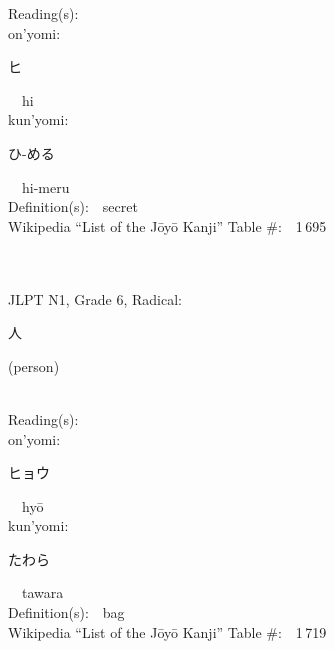\begin{multicols}{2}
Reading(s):\ \ \\
{\hspace*{1em}}on'yomi:\ \ \\
{\hspace*{2em}}{\begin{CJK}{UTF8}{min} ヒ \end{CJK}}\ \ hi\ \ \\
{\hspace*{1em}}kun'yomi:\ \ \\
{\hspace*{2em}}{\begin{CJK}{UTF8}{min} ひ-める \end{CJK}}\ \ hi-meru\ \ \\
Definition(s):\ \ secret \\
Wikipedia ``List of the J\=oy\=o Kanji'' Table \#:\ \ 1\,695 \\
\ \ \\
{\fontsize{34pt}{40pt}  }\ \ \\  %
{JLPT N1, Grade 6, Radical:\ \ {\begin{CJK}{UTF8}{min} 人 \end{CJK}} (person) } \\
Reading(s):\ \ \\
{\hspace*{1em}}on'yomi:\ \ \\
{\hspace*{2em}}{\begin{CJK}{UTF8}{min} ヒョウ \end{CJK}}\ \ hy\=o\ \ \\
{\hspace*{1em}}kun'yomi:\ \ \\
{\hspace*{2em}}{\begin{CJK}{UTF8}{min} たわら \end{CJK}}\ \ tawara\ \ \\
Definition(s):\ \ bag \\
Wikipedia ``List of the J\=oy\=o Kanji'' Table \#:\ \ 1\,719 \\
\ \ \\
{\fontsize{34pt}{40pt}  }\ \ \\  %

\end{multicols}
